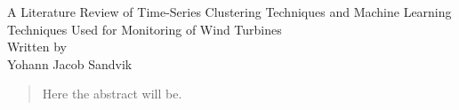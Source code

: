 \documentclass[11pt,english,a4paper,openright]{report}
\begin{document}
\setlength\parindent{0pt} %

\pagestyle{fancy}

\begin{titlepage}
    \centering
    
    {\LARGE A Literature Review of Time-Series Clustering Techniques and Machine Learning Techniques Used for Monitoring of Wind Turbines} \\ [\baselineskip]
    
    {\Large Written by} \\ 
    {\Large Yohann  Jacob Sandvik } \\

    \begin{abstract}
        Here the abstract will be.
    \end{abstract}

\end{titlepage}

\fancyhf{}

\tableofcontents
\newpage












% 

\printbibliography
\end{document}

